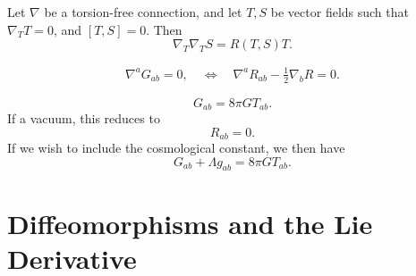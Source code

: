 \documentclass[12pt]{article}
\begin{document}
\begin{noteEquation}
Let $\nabla$ be a torsion-free connection, and let $T,S$ be vector fields such that $\nabla_T T = 0$, and $[T,S] = 0$. Then
\begin{equation}
\nabla_T \nabla_T S = R(T,S) T.
\end{equation}
\end{noteEquation}

\begin{noteEquation}
\begin{align}
\nabla^aG_{ab} = 0, \quad \Leftrightarrow \quad \nabla^a R_{ab} - \frac{1}{2} \nabla_b R = 0.
\end{align}
\end{noteEquation}

\begin{noteEquation}
\begin{equation}
G_{ab} = 8\pi G T_{ab}.
\end{equation}
If a vacuum, this reduces to
\begin{equation}
R_{ab} = 0.
\end{equation}
If we wish to include the cosmological constant, we then have
\begin{equation}
G_{ab} + \Lambda g_{ab} = 8 \pi G T_{ab}.
\end{equation}
\end{noteEquation}

\section{Diffeomorphisms and the Lie Derivative}
\end{document}
